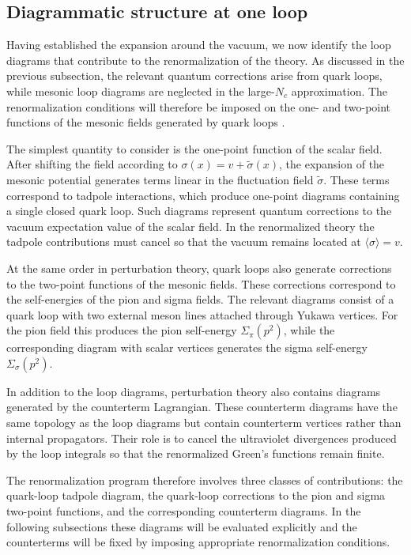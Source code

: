 \subsection{Diagrammatic structure at one loop}

Having established the expansion around the vacuum, we now identify
the loop diagrams that contribute to the renormalization of the
theory. As discussed in the previous subsection, the relevant quantum
corrections arise from quark loops, while mesonic loop diagrams are
neglected in the large-$N_c$ approximation. The renormalization
conditions will therefore be imposed on the one- and two-point
functions of the mesonic fields generated by quark loops
\cite{PeskinSchroeder1995,Folkestad2018}.

The simplest quantity to consider is the one-point function of the
scalar field. After shifting the field according to
$\sigma(x)=v+\tilde{\sigma}(x)$, the expansion of the mesonic
potential generates terms linear in the fluctuation field
$\tilde{\sigma}$. These terms correspond to tadpole interactions,
which produce one-point diagrams containing a single closed quark
loop. Such diagrams represent quantum corrections to the vacuum
expectation value of the scalar field. In the renormalized theory the
tadpole contributions must cancel so that the vacuum remains located
at $\langle\sigma\rangle=v$.

At the same order in perturbation theory, quark loops also generate
corrections to the two-point functions of the mesonic fields. These
corrections correspond to the self-energies of the pion and sigma
fields. The relevant diagrams consist of a quark loop with two
external meson lines attached through Yukawa vertices. For the pion
field this produces the pion self-energy $\Sigma_\pi(p^2)$, while the
corresponding diagram with scalar vertices generates the sigma
self-energy $\Sigma_\sigma(p^2)$.

In addition to the loop diagrams, perturbation theory also contains
diagrams generated by the counterterm Lagrangian. 
These counterterm diagrams have the same
topology as the loop diagrams but contain counterterm vertices rather
than internal propagators. Their role is to cancel the ultraviolet
divergences produced by the loop integrals so that the renormalized
Green's functions remain finite.

The renormalization program therefore involves three classes of
contributions: the quark-loop tadpole diagram, the quark-loop
corrections to the pion and sigma two-point functions, and the
corresponding counterterm diagrams. In the following subsections these
diagrams will be evaluated explicitly and the counterterms will be
fixed by imposing appropriate renormalization conditions.

